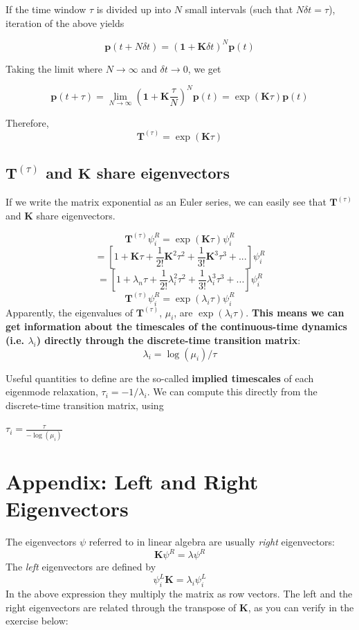 \documentclass[11pt, oneside]{article}   	%
\begin{document}
If the time window $\tau$ is divided up into $N$  small intervals (such that $N \delta t = \tau$), iteration of the above  yields

$$\mathbf{p}(t+N\delta t) = (\mathbf{1} + \mathbf{K} \delta t)^N\mathbf{p}(t)$$

Taking the limit where $N \rightarrow \infty$ and $\delta t \rightarrow 0$, we get

$$\mathbf{p}(t+\tau) = \lim_{N \rightarrow \infty} (\mathbf{1} + \mathbf{K} \frac{\tau}{N})^N\mathbf{p}(t) = \exp(\mathbf{K}\tau)\mathbf{p}(t)$$

Therefore,
$$\mathbf{T}^{(\tau)} = \exp(\mathbf{K}\tau)$$



\subsection*{$\mathbf{T}^{(\tau)}$ and $\mathbf{K}$ share eigenvectors }

If we write the matrix exponential as an Euler series, we can easily see that $\mathbf{T}^{(\tau)}$ and $\mathbf{K}$ share eigenvectors.  

$$\mathbf{T}^{(\tau)}\psi_i^R = \exp(\mathbf{K}\tau) \psi_i^R$$
$$= [1 + \mathbf{K}\tau + \frac{1}{2!}\mathbf{K}^2\tau^2 + \frac{1}{3!}\mathbf{K}^3\tau^3 + ...] \psi_i^R$$
$$= [1 + \lambda_n\tau + \frac{1}{2!}\lambda_i^2\tau^2 + \frac{1}{3!}\lambda_i^3\tau^3 + ...]  \psi_i^R$$
$$ \mathbf{T}^{(\tau)} \psi_i^R = \exp(\lambda_i \tau) \psi_i^R$$
Apparently, the eigenvalues of $ \mathbf{T}^{(\tau)}$, $\mu_i$, are $\exp(\lambda_i \tau)$.  \textbf{This means we can get information about the timescales of the continuous-time dynamics (i.e. $\lambda_i$) directly through the discrete-time transition matrix}:
$$ \lambda_i = \log(\mu_i)/\tau$$

Useful quantities to define are the so-called \textbf{implied timescales} of each eigenmode relaxation, $\tau_i = -1/\lambda_i$.  We can compute this directly from the discrete-time transition matrix, using

\begin{center}
$\boxed{ \tau_i = \frac{\tau}{-\log(\mu_i)}  }$
\end{center}


\section*{Appendix: Left and Right Eigenvectors}

The eigenvectors $\psi$ referred to in linear algebra are usually \textit{right} eigenvectors:
\[
\mathbf{K} \psi^R = \lambda \psi^R
\]
The \textit{left} eigenvectors are defined by
\[
\psi_i^L \mathbf{K} = \lambda_i \psi_i^L
\]
In the above expression they multiply the matrix as row vectors.   The left and the right eigenvectors are related through the transpose of $\mathbf{K}$, as you can verify in the exercise below:
\end{document}
